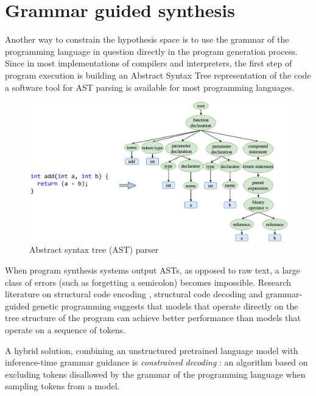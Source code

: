 \newpage
\section{Grammar guided synthesis}
\label{sec:grammar-guided}

Another way to constrain the hypothesis space is to use the grammar of the programming language in question directly in the program generation process.
Since in most implementations of compilers and interpreters, the first step of program execution is building an Abstract Syntax Tree representation of the code a software tool for AST parsing is available for most programming languages.

\begin{figure}[H]
    \centering
    \includegraphics[width=\linewidth]{images/ast.png}
    \caption{Abstract syntax tree (AST) parser}
    \label{fig:ast-parser}
\end{figure}

When program synthesis systems  output ASTs, as opposed to raw text, a large class of errors (such as forgetting a semicolon) becomes impossible. 
Research literature on structural code encoding \cite{alon2019structural,zhang2015tree}, structural code decoding \cite{jiang2021ast,zhu2019grammarcnn} and grammar-guided genetic programming \cite{bunelLeveragingGrammarReinforcement2018, manriqueGrammarguidedGeneticProgramming2009, sobaniaChallengesProgramSynthesis2020a} suggests that models that operate directly on the tree structure of the program can achieve better performance than models that operate on a sequence of tokens.

A hybrid solution, combining an unstructured pretrained language model with inference-time grammar guidance is \emph{constrained decoding} \cite{melcerConstrainedDecodingCode2024}: an algorithm based on excluding tokens disallowed by the grammar of the programming language when sampling tokens from a model.

